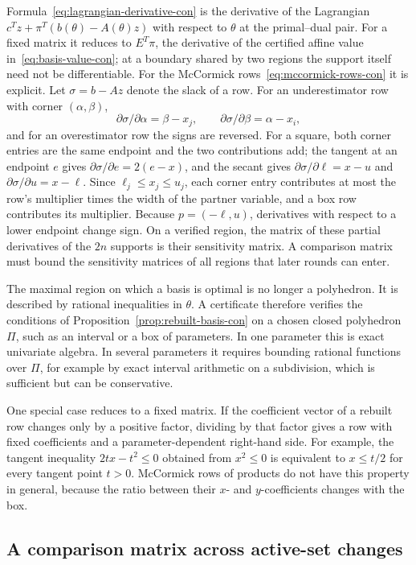 Formula~\eqref{eq:lagrangian-derivative-con} is the derivative of the
Lagrangian $c^Tz+\pi^T(b(\theta)-A(\theta)z)$ with respect to $\theta$ at
the primal--dual pair. For a fixed matrix it reduces to $E^T\pi$, the
derivative of the certified affine value in~\eqref{eq:basis-value-con};
at a boundary shared by two regions the support itself need not be
differentiable. For the McCormick
rows~\eqref{eq:mccormick-rows-con} it is explicit. Let $\sigma=b-Az$
denote the slack of a row. For an underestimator row with corner
$(\alpha,\beta)$,
\[
 \partial\sigma/\partial\alpha=\beta-x_j,\qquad
 \partial\sigma/\partial\beta=\alpha-x_i,
\]
and for an overestimator row the signs are reversed. For a square, both
corner entries are the same endpoint and the two contributions add; the
tangent at an endpoint $e$ gives $\partial\sigma/\partial e=2(e-x)$, and
the secant gives $\partial\sigma/\partial\ell=x-u$ and
$\partial\sigma/\partial u=x-\ell$. Since $\ell_j\le x_j\le u_j$, each
corner entry contributes at most the row's multiplier times the width of
the partner variable, and a box row contributes its multiplier. Because
$p=(-\ell,u)$, derivatives with respect to a lower endpoint change sign.
On a verified region, the matrix of these partial derivatives of the $2n$
supports is their sensitivity matrix. A comparison matrix must bound the
sensitivity matrices of all regions that later rounds can enter.

The maximal region on which a basis is optimal is no longer a polyhedron.
It is described by rational inequalities in $\theta$. A certificate
therefore verifies the conditions of
Proposition~\ref{prop:rebuilt-basis-con} on a chosen closed polyhedron
$\Pi$, such as an interval or a box of parameters. In one parameter this
is exact univariate algebra. In several parameters it requires bounding
rational functions over $\Pi$, for example by exact interval arithmetic on
a subdivision, which is sufficient but can be conservative.

One special case reduces to a fixed matrix. If the coefficient vector of a
rebuilt row changes only by a positive factor, dividing by that factor gives
a row with fixed coefficients and a parameter-dependent right-hand side.
For example, the tangent inequality $2tx-t^2\le0$ obtained from $x^2\le0$
is equivalent to $x\le t/2$ for every tangent point $t>0$. McCormick rows of
products do not have this property in general, because the ratio between
their $x$- and $y$-coefficients changes with the box.

\subsection{A comparison matrix across active-set changes}\label{sec:cover-con}

